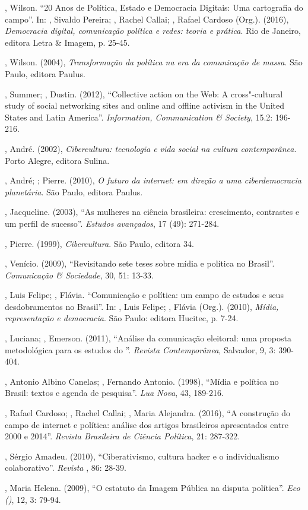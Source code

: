 \begin{Parskip}
, Wilson. ``20 Anos de Política, Estado e Democracia Digitais: Uma
cartografia do campo''. In: , Sivaldo Pereira; , Rachel
Callai; , Rafael Cardoso (Org.). (2016), \emph{Democracia
digital, comunicação política e redes: teoria e prática}. Rio
de Janeiro, editora Letra \& Imagem, p. 25-45.

, Wilson. (2004), \emph{Transformação da política na era da
comunicação de massa}. São Paulo, editora Paulus.

, Summer; , Dustin. (2012), ``Collective action on the Web: A
cross"-cultural study of social networking sites and online and offline
activism in the United States and Latin America''. \emph{Information,
Communication \& Society}, 15.2: 196-216.

, André. (2002), \emph{Cibercultura: tecnologia e vida social na
cultura contemporânea}. Porto Alegre, editora Sulina.

, André; ; Pierre. (2010), \emph{O futuro da internet: em
direção a uma ciberdemocracia planetária}. São Paulo, editora Paulus.

, Jacqueline. (2003), ``As mulheres na ciência brasileira:
crescimento, contrastes e um perfil de sucesso''. \emph{Estudos
avançados}, 17 (49): 271-284.

, Pierre. (1999), \emph{Cibercultura}. São Paulo, editora 34.

, Venício. (2009), ``Revisitando sete teses sobre mídia e política
no Brasil''. \emph{Comunicação \& Sociedade}, 30, 51: 13-33.

, Luis Felipe; , Flávia. ``Comunicação e política: um campo
de estudos e seus desdobramentos no Brasil''. In: , Luis Felipe;
, Flávia (Org.). (2010), \emph{Mídia, representação e democracia}.
São Paulo: editora Hucitec, p. 7-24.

, Luciana; , Emerson. (2011), ``Análise da comunicação
eleitoral: uma proposta metodológica para os estudos do ''.
\emph{Revista Contemporânea}, Salvador, 9, 3: 390-404.

, Antonio Albino Canelas; , Fernando Antonio. (1998),
``Mídia e política no Brasil: textos e agenda de pesquisa''. \emph{Lua
Nova}, 43, 189-216.

, Rafael Cardoso; , Rachel Callai; , Maria
Alejandra. (2016), ``A construção do campo de internet e política:
análise dos artigos brasileiros apresentados entre 2000 e 2014''.
\emph{Revista Brasileira de Ciência Política}, 21: 287-322.

, Sérgio Amadeu. (2010), ``Ciberativismo, cultura hacker e o
individualismo colaborativo''. \emph{Revista }, 86: 28-39.

, Maria Helena. (2009), ``O estatuto da Imagem Pública na disputa
política''. \emph{Eco ()}, 12, 3: 79-94.
\end{Parskip}